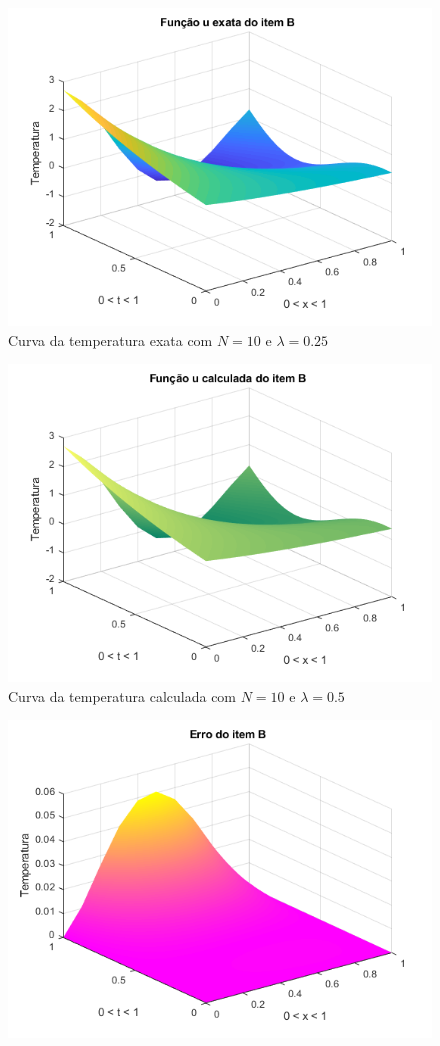 \documentclass[12pt]{article}
\begin{document}
\begin{spacing}{1.5}
\begin{figure}[ht!]
    \centering
    \includegraphics[width=0.8\linewidth]{Primeira_Tarefa/ItemB/n10_lambda0-25_exata.png}
    \caption{Curva da temperatura exata com $N=10$ e $\lambda=0.25$}
    \label{fig:B_n10lambda0-25_exata}
\end{figure}
\begin{figure}
    \centering
    \includegraphics[width=0.8\linewidth]{Primeira_Tarefa/ItemB/n10_lambda0-25_calc.png}
    \caption{Curva da temperatura calculada com $N=10$ e $\lambda=0.5$}
    \label{fig:B_n10lambda0-25_calc}
\end{figure}
\begin{figure}
    \centering
    \includegraphics[width=0.8\linewidth]{Primeira_Tarefa/ItemB/n10_lambda0-25_erro.png}

\end{figure}
\end{spacing}
\end{document}
